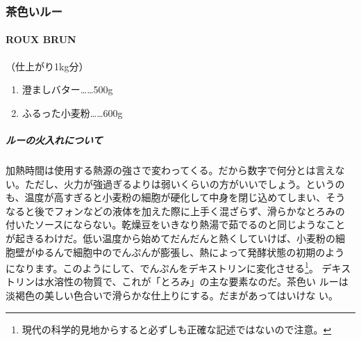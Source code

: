 \documentclass[twoside,12Q,b5j]{escoffierltjsbook}
\def\tightlist{\itemsep1pt\parskip0pt\parsep0pt}
\newenvironment{recette}{\begin{small}\begin{spacing}{1}\begin{multicols}{2}}{\end{multicols}\end{spacing}\end{small}}
\begin{document}
\begin{recette}
  
\subsubsection{茶色いルー}\label{ux8336ux8272ux3044ux30ebux30fc}

\paragraph{ROUX BRUN}\label{roux-brun}


（仕上がり1kg分）

\begin{enumerate}
\def\labelenumi{\arabic{enumi}.}
\tightlist
\item
  澄ましバター\ldots{}\ldots{}500g
\item
  ふるった小麦粉\ldots{}\ldots{}600g
\end{enumerate}

\vspace*{1.7\zw}

\subparagraph{ルーの火入れについて}\label{cuisson-du-roux}


加熱時間は使用する熱源の強さで変わってくる。だから数字で何分とは言えな
い。ただし、火力が強過ぎるよりは弱いくらいの方がいいでしょう。というの
も、温度が高すぎると小麦粉の細胞が硬化して中身を閉じ込めてしまい、そう
なると後でフォンなどの液体を加えた際に上手く混ざらず、滑らかなとろみの
付いたソースにならない。乾燥豆をいきなり熱湯で茹でるのと同じようなこと
が起きるわけだ。低い温度から始めてだんだんと熱くしていけば、小麦粉の細
胞壁がゆるんで細胞中のでんぷんが膨張し、熱によって発酵状態の初期のよう
になります。このようにして、でんぷんをデキストリンに変化させる\footnote{現代の科学的見地からすると必ずしも正確な記述ではないので注意。}。
デキストリンは水溶性の物質で、これが「とろみ」の主な要素なのだ。茶色い
ルーは淡褐色の美しい色合いで滑らかな仕上りにする。だまがあってはいけな
い。


\end{recette}
\end{document}
